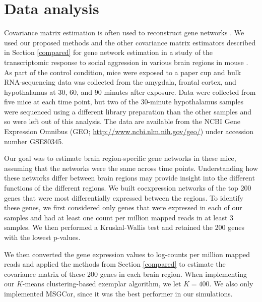 \documentclass[useAMS,referee,usenatbib]{biom}
\begin{document}
\section{Data analysis}
\label{gene analysis}

Covariance matrix estimation is often used to reconstruct gene networks \citep{markowetz2007inferring}. We used our proposed methods and the other covariance matrix estimators described in Section \ref{compared} for gene network estimation in a study of the transcriptomic response to social aggression in various brain regions in mouse \citep{saul2017transcriptional}. As part of the control condition, mice were exposed to a paper cup and bulk RNA-sequencing data was collected from the amygdala, frontal cortex, and hypothalamus at 30, 60, and 90 minutes after exposure. Data were collected from five mice at each time point, but two of the 30-minute hypothalamus samples were sequenced using a different library preparation than the other samples and so were left out of this analysis. The data are available from the NCBI Gene Expression Omnibus (GEO; \url{http://www.ncbi.nlm.nih.gov/geo/}) under accession number GSE80345.

Our goal was to estimate brain region-specific gene networks in these mice, assuming that the networks were the same across time points. Understanding how these networks differ between brain regions may provide insight into the different functions of the different regions. We built coexpression networks of the top 200 genes that were most differentially expressed between the regions. To identify these genes, we first considered only genes that were expressed in each of our samples and had at least one count per million mapped reads in at least 3 samples. We then performed a Kruskal-Wallis test and retained the 200 genes with the lowest p-values.

We then converted the gene expression values to log-counts per million mapped reads and applied the methods from Section \ref{compared} to estimate the covariance matrix of these 200 genes in each brain region. When implementing our $K$-means clustering-based exemplar algorithm, we let $K = 400$. We also only implemented MSGCor, since it was the best performer in our simulations.
\end{document}
